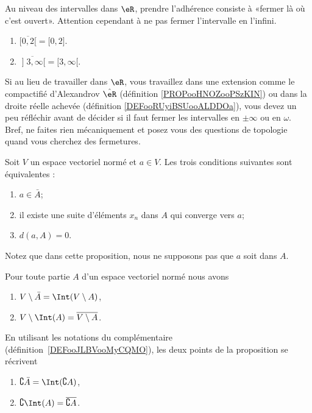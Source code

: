 \begin{example}
	Au niveau des intervalles dans \( \eR\), prendre l'adhérence consiste à «fermer là où c'est ouvert». Attention cependant à ne pas fermer l'intervalle en l'infini.
	\begin{enumerate}
		\item
		      \( \overline{ \mathopen[ 0 , 2 [ }=\mathopen[ 0 , 2 \mathclose]\).
		\item
		      \( \overline{ \mathopen] 3 , \infty \mathopen[ }=\mathopen[ 3 , \infty [\).
	\end{enumerate}
	Si au lieu de travailler dans \( \eR\), vous travaillez dans une extension comme le compactifié d'Alexandrov \( \hat \eR\) (définition \ref{PROPooHNOZooPSzKIN}) ou dans la droite réelle achevée (définition \ref{DEFooRUyiBSUooALDDOa}), vous devez un peu réfléchir avant de décider si il faut fermer les intervalles en \( \pm \infty\) ou en \( \omega\). Bref, ne faites rien mécaniquement et posez vous des questions de topologie quand vous cherchez des fermetures.
\end{example}

\begin{proposition}     \label{PROPooEURXooHHpkhd}
	Soit \( V\) un espace vectoriel normé et \( a\in V\). Les trois conditions suivantes sont équivalentes :
	\begin{enumerate}
		\item
		      \( a\in\bar A\);
		\item
		      il existe une suite d'éléments \( x_n\) dans \( A\) qui converge vers \( a\);
		\item
		      \( d(a,A)=0\).
	\end{enumerate}
\end{proposition}
Notez que dans cette proposition, nous ne supposons pas que \( a\) soit dans \( A\).

\begin{proposition}		\label{PropComleIntBar}
	Pour toute partie \( A\) d'un espace vectoriel normé nous avons
	\begin{enumerate}
		\item
		      \( V\setminus\bar A=\Int(V\setminus A)\),
		\item
		      \( V\setminus\Int(A)=\overline{ V\setminus A }\).
	\end{enumerate}
\end{proposition}

En utilisant les notations du complémentaire (définition~\ref{DEFooJLBVooMyCQMO}), les deux points de la proposition se récrivent
\begin{enumerate}
	\item
	      \( \complement \bar A=\Int(\complement A)\),
	\item\label{ItemLemPropComplementiv}
	      \( \complement\Int(A)=\overline{ \complement A }\).
\end{enumerate}


